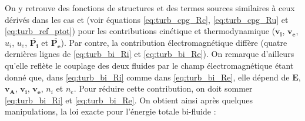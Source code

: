  On y retrouve des fonctions de structures et des termes sources similaires à ceux dérivés dans les cas  et  (voir équations \eqref{eq:turb_cpg_Rc}, \eqref{eq:turb_cpg_Ru} et \eqref{eq:turb_ref_ptot}) pour les contributions cinétique et thermodynamique ($\boldsymbol{v_i}$, $\boldsymbol{v_e}$, $u_i$, $u_e$, $\overline{\boldsymbol{P_i}}$ et $\overline{\boldsymbol{P_e}}$). Par contre, la contribution électromagnétique diffère (quatre dernières lignes de \eqref{eq:turb_bi_Ri} et \eqref{eq:turb_bi_Re}). On remarque d'ailleurs qu'elle reflète le couplage des deux fluides par le champ électromagnétique étant donné que, dans \eqref{eq:turb_bi_Ri} comme dans \eqref{eq:turb_bi_Re}, elle dépend de $\boldsymbol{E}$, $\boldsymbol{v_A}$, $\boldsymbol{v_i}$, $\boldsymbol{v_e}$, $n_i$ et $n_e$. Pour réduire cette contribution, on doit sommer \eqref{eq:turb_bi_Ri} et \eqref{eq:turb_bi_Re}. On obtient ainsi après quelques manipulations, la loi exacte pour l'énergie totale bi-fluide :
